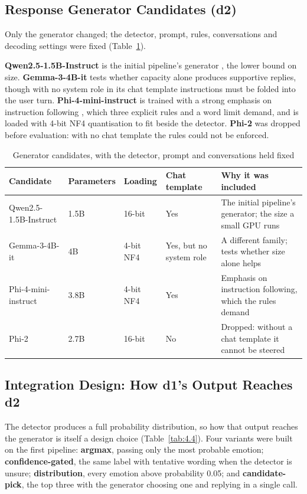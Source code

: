 \subsection{Response Generator Candidates (d2)}

Only the generator changed; the detector, prompt, rules, conversations and decoding settings were fixed (Table~\ref{tab:4.3}).

\textbf{Qwen2.5-1.5B-Instruct} is the initial pipeline's generator \cite{qwen2024}, the lower bound on size. \textbf{Gemma-3-4B-it} tests whether capacity alone produces supportive replies, though with no system role in its chat template instructions must be folded into the user turn. \textbf{Phi-4-mini-instruct} is trained with a strong emphasis on instruction following \cite{abouelenin2025phi4mini}, which three explicit rules and a word limit demand, and is loaded with 4-bit NF4 quantisation \cite{dettmers2023qlora} to fit beside the detector. \textbf{Phi-2} was dropped before evaluation: with no chat template the rules could not be enforced.

\begin{table}[H]
\centering
\scriptsize
\begin{tabularx}{\textwidth}{@{}lXXXX@{}}
\toprule
\textbf{Candidate} & \textbf{Parameters} & \textbf{Loading} & \textbf{Chat template} & \textbf{Why it was included} \\
\midrule
Qwen2.5-1.5B-Instruct & 1.5B & 16-bit & Yes & The initial pipeline's generator; the size a small GPU runs \\
Gemma-3-4B-it & 4B & 4-bit NF4 & Yes, but no system role & A different family; tests whether size alone helps \\
Phi-4-mini-instruct & 3.8B & 4-bit NF4 & Yes & Emphasis on instruction following, which the rules demand \\
Phi-2 & 2.7B & 16-bit & No & Dropped: without a chat template it cannot be steered \\
\bottomrule
\end{tabularx}
\caption{Generator candidates, with the detector, prompt and conversations held fixed}
\label{tab:4.3}
\end{table}

\subsection{Integration Design: How d1's Output Reaches d2}
\label{sec:4.2.3}

The detector produces a full probability distribution, so how that output reaches the generator is itself a design choice (Table~\ref{tab:4.4}). Four variants were built on the first pipeline: \textbf{argmax}, passing only the most probable emotion; \textbf{confidence-gated}, the same label with tentative wording when the detector is unsure; \textbf{distribution}, every emotion above probability 0.05; and \textbf{candidate-pick}, the top three with the generator choosing one and replying in a single call.

